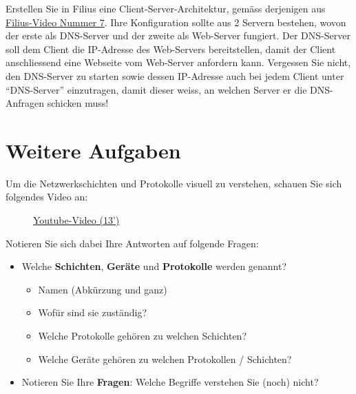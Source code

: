 \begin{myexercise}
	Erstellen Sie in Filius eine Client-Server-Architektur, gemäss derjenigen aus \href{https://www.youtube.com/watch?v=Kn8v_HrckUM&list=PLUfZiVdJui-57k0VcRecHX0JTEhOMgiKP}{Filius-Video Nummer 7}. Ihre Konfiguration sollte aus 2 Servern bestehen, wovon der erste als \gls{DNS}-Server und der zweite als Web-Server fungiert. Der DNS-Server soll dem Client die \gls{IP}-Adresse des Web-Servers bereitstellen, damit der Client anschliessend eine Webseite vom Web-Server anfordern kann. Vergessen Sie nicht, den \gls{DNS}-Server zu starten sowie dessen \gls{IP}-Adresse auch bei jedem Client unter \enquote{\gls{DNS}-Server} einzutragen, damit dieser weiss, an welchen Server er die \gls{DNS}-Anfragen schicken muss!
\end{myexercise}

\section{Weitere Aufgaben}

\begin{myexercise}
	Um die Netzwerkschichten und Protokolle visuell zu verstehen, schauen Sie sich folgendes Video an:
	\begin{figure}[H]
		\href{https://www.youtube.com/watch?v=PBWhzz_Gn10}{Youtube-Video (13')}
	\end{figure}

	Notieren Sie sich dabei Ihre Antworten auf folgende Fragen:
	\begin{itemize}
		\item Welche \textbf{Schichten}, \textbf{Geräte} und \textbf{Protokolle} werden genannt?
		      \begin{itemize}
			      \item Namen (Abkürzung und ganz)
			      \item Wofür sind sie zuständig?
			      \item Welche Protokolle gehören zu welchen Schichten?
			      \item Welche Geräte gehören zu welchen Protokollen / Schichten?
		      \end{itemize}
		\item Notieren Sie Ihre \textbf{Fragen}: Welche Begriffe verstehen Sie (noch) nicht?
	\end{itemize}
\end{myexercise}

